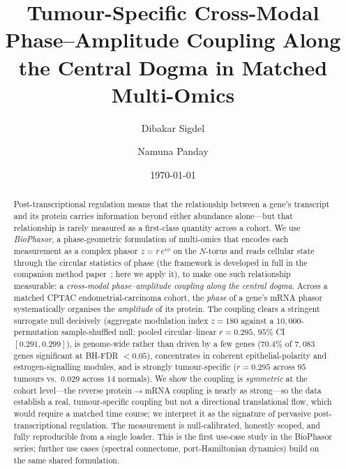 \documentclass[preprint,12pt,amsmath,amssymb,superscriptaddress,floatfix]{revtex4-2}
\begin{document}

\title{Tumour-Specific Cross-Modal Phase--Amplitude Coupling Along the Central Dogma in Matched Multi-Omics}

\author{Dibakar Sigdel}
\author{Namuna Panday}

\date{\today}

\begin{abstract}
Post-transcriptional regulation means that the relationship between a gene's
transcript and its protein carries information beyond either abundance alone---but
that relationship is rarely measured as a first-class quantity across a cohort.
We use \emph{BioPhasor}, a phase-geometric formulation of multi-omics that encodes
each measurement as a complex phasor $z=r\,e^{i\phi}$ on the $N$-torus and reads
cellular state through the circular statistics of phase (the framework is
developed in full in the companion method paper~\cite{biophasor_platform}; here we
apply it), to make one such relationship measurable: a \emph{cross-modal
phase--amplitude coupling along the central dogma}. Across a matched CPTAC
endometrial-carcinoma cohort, the \emph{phase} of a gene's mRNA phasor
systematically organises the \emph{amplitude} of its protein. The coupling clears
a stringent surrogate null decisively (aggregate modulation index $z=180$ against
a $10{,}000$-permutation sample-shuffled null; pooled circular--linear $r=0.295$,
$95\%$ CI $[0.291,0.299]$), is genome-wide rather than driven by a few genes
($70.4\%$ of $7{,}083$ genes significant at BH-FDR $<0.05$), concentrates in
coherent epithelial-polarity and estrogen-signalling modules, and is strongly
tumour-specific ($r=0.295$ across $95$ tumours vs.\ $0.029$ across $14$ normals).
We show the coupling is \emph{symmetric} at the cohort level---the reverse
protein$\to$mRNA coupling is nearly as strong---so the data establish a real,
tumour-specific coupling but not a directional translational flow, which would
require a matched time course; we interpret it as the signature of pervasive
post-transcriptional regulation. The measurement is null-calibrated, honestly
scoped, and fully reproducible from a single loader. This is the first use-case
study in the BioPhasor series; further use cases (spectral connectome,
port-Hamiltonian dynamics) build on the same shared formulation.
\end{abstract}
\end{document}
